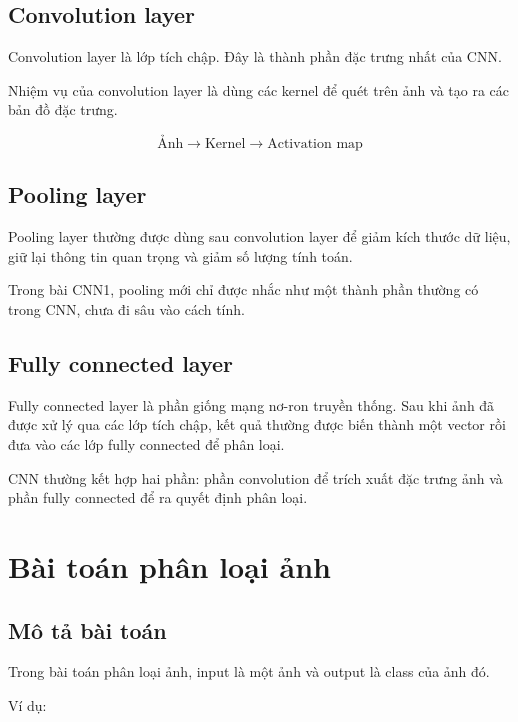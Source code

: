 \documentclass[12pt,a4paper]{report}
\begin{document}
\section{Convolution layer}

Convolution layer là lớp tích chập. Đây là thành phần đặc trưng nhất của CNN.

Nhiệm vụ của convolution layer là dùng các kernel để quét trên ảnh và tạo ra các bản đồ đặc trưng.

\[
    \text{Ảnh}
    \rightarrow
    \text{Kernel}
    \rightarrow
    \text{Activation map}
\]

\section{Pooling layer}

Pooling layer thường được dùng sau convolution layer để giảm kích thước dữ liệu, giữ lại thông tin quan trọng và giảm số lượng tính toán.

Trong bài CNN1, pooling mới chỉ được nhắc như một thành phần thường có trong CNN, chưa đi sâu vào cách tính.

\section{Fully connected layer}

Fully connected layer là phần giống mạng nơ-ron truyền thống. Sau khi ảnh đã được xử lý qua các lớp tích chập, kết quả thường được biến thành một vector rồi đưa vào các lớp fully connected để phân loại.

\begin{ghinho}
CNN thường kết hợp hai phần: phần convolution để trích xuất đặc trưng ảnh và phần fully connected để ra quyết định phân loại.
\end{ghinho}

\chapter{Bài toán phân loại ảnh}

\section{Mô tả bài toán}

Trong bài toán phân loại ảnh, input là một ảnh và output là class của ảnh đó.

Ví dụ:
\end{document}
